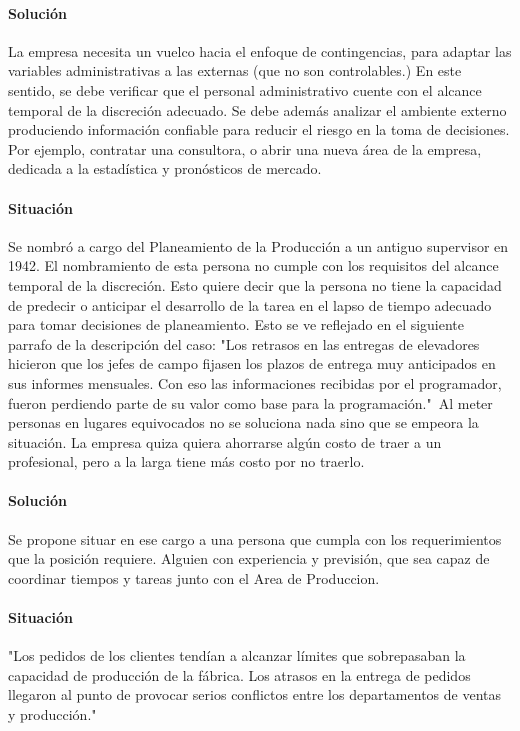 \documentclass[12pt,a4paper,spanish]{article}
\begin{document}
\paragraph{Soluci\'on}
La empresa necesita un vuelco hacia el enfoque de contingencias, para adaptar las variables administrativas a las externas (que no son controlables.) En este sentido, se debe verificar que el personal administrativo cuente con el alcance temporal de la discreci\'on adecuado. Se debe adem\'{a}s analizar el ambiente externo produciendo informaci\'on confiable para reducir el riesgo en la toma de decisiones. Por ejemplo, contratar una consultora, o abrir una nueva \'area de la empresa, dedicada a la estad\'istica y pron\'osticos de mercado.

\paragraph{Situaci\'on}
Se nombr\'o a cargo del Planeamiento de la Producci\'on a un antiguo supervisor en 1942. El nombramiento de esta persona no cumple con los requisitos del alcance temporal de la discreci\'on. Esto quiere decir que la persona no tiene la capacidad de predecir o anticipar el desarrollo de la tarea en el lapso de tiempo adecuado para tomar decisiones de planeamiento. Esto se ve reflejado en el siguiente parrafo de la descripci\'on del caso: "Los retrasos en las entregas de elevadores hicieron que los jefes de campo fijasen los plazos de entrega muy anticipados en sus informes mensuales. Con eso las informaciones recibidas por el programador, fueron perdiendo parte de su valor como base para la programaci\'on."\ Al meter personas en lugares equivocados no se soluciona nada sino que se empeora la situaci\'on. La empresa quiza quiera ahorrarse alg\'un costo de traer a un profesional, pero a la larga tiene m\'as costo por no traerlo.
\paragraph{Soluci\'on}
Se propone situar en ese cargo a una persona que cumpla con los requerimientos que la posici\'on requiere. Alguien con experiencia y previsi\'on, que sea capaz de coordinar tiempos y tareas junto con el Area de Produccion.

\paragraph{Situaci\'on}
"Los pedidos de los clientes tend\'ian a alcanzar l\'imites que sobrepasaban la capacidad de producci\'on de la f\'abrica. Los atrasos en la entrega de pedidos llegaron al punto de provocar serios conflictos entre los departamentos de ventas y producci\'on."
\end{document}
